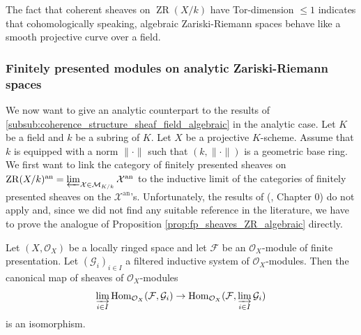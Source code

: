 \documentclass [11pt,reqno]{amsart}
\newcommand{\1}{\mathmybb{1}}
\def\cF{{\mathcal{F}}}
\def\cG{{\mathcal{G}}}
\def\cM{{\mathcal{M}}}
\def\cO{{\mathcal{O}}}
\def\cX{{\mathcal{X}}}
\def\an{\operatorname{an}}
\def\Hom{\operatorname{Hom}}
\def\ZR{\operatorname{ZR}}
\begin{document}
\begin{remark}
\label{rem:coherent_sheaves_Tor-dimension}
The fact that coherent sheaves on $\ZR(X/k)$ have Tor-dimension $\leq 1$ indicates that cohomologically speaking, algebraic Zariski-Riemann spaces behave like a smooth projective curve over a field. 
\end{remark}

\subsubsection{Finitely presented modules on analytic Zariski-Riemann spaces}
\label{subsub:coherence_struture_sheaf_GAGA_analytic}

We now want to give an analytic counterpart to the results of \ref{subsub:coherence_structure_sheaf_field_algebraic} in the analytic case. Let $K$ be a field and $k$ be a subring of $K$. Let $X$ be a projective $K$-scheme. Assume that $k$ is equipped with a norm $\|\cdot\|$ such that $(k,\|\cdot\|)$ is a geometric base ring. We first want to link the category of finitely presented sheaves on $\ZR(X/k)^{\an}=\varprojlim_{\cX\in\cM_{K/k}}\cX^{\an}$ to the inductive limit of the categories of finitely presented sheaves on the $\cX^{\an}$'s. Unfortunately, the results of (\cite{Fujiwara-Kato}, Chapter 0) do not apply and, since we did not find any suitable reference in the literature, we have to prove the analogue of Proposition \ref{prop:fp_sheaves_ZR_algebraic} directly.  

\begin{proposition}
\label{prop:fp_sheaves_compact_OX_mdoules}
Let $(X,\cO_{X})$ be a locally ringed space and let $\cF$ be an $\cO_{X}$-module of finite presentation. Let $(\cG_{i})_{i\in I}$ a filtered inductive system of $\cO_{X}$-modules. Then the canonical map of sheaves of $\cO_{X}$-modules 
\begin{align*}
\displaystyle\varinjlim_{i\in I}\Hom_{\cO_{X}}(\cF,\cG_{i}) \to \Hom_{\cO_{X}}(\cF,\varinjlim_{i\in I}\cG_{i})
\end{align*}
is an isomorphism.
\end{proposition}
\end{document}
